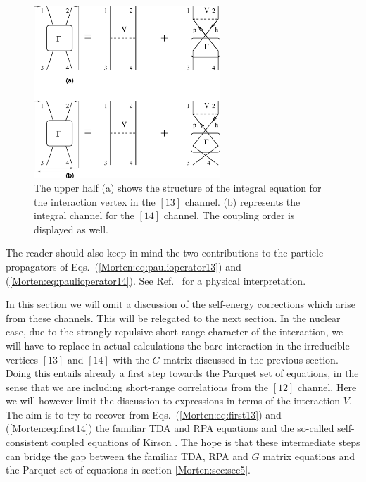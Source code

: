 \begin{figure}%
	\begin{center} \includegraphics[width=7cm]{ch1314.eps}
      	\end{center} 

\caption{The upper half (a) shows the structure of
the integral equation for the interaction vertex in the $[13]$
channel. (b) represents the integral channel for the $[14]$
channel.  The coupling order is displayed as well.}
\label{Morten:fig:figs1314}
\end{figure}
The reader should also keep in mind the two contributions to the
particle propagators of Eqs.~(\ref{Morten:eq:paulioperator13}) and
(\ref{Morten:eq:paulioperator14}).  See Ref.~ for
a physical interpretation.

In this section we will omit a discussion of the self-energy corrections
which arise from these channels. This
will be relegated to the next section. In the nuclear
case, due to the strongly repulsive short-range character 
of the interaction, we will have 
to replace in actual calculations 
the bare interaction in the irreducible vertices $[13]$ and $[14]$
with the $G$ matrix discussed in the previous section. 
Doing this entails already a first step towards the Parquet set of equations,
in the sense that we are including short-range correlations from the 
$[12]$ channel. 
Here we will however limit the discussion to expressions 
in terms of the interaction $V$.
The aim is to try 
to recover from Eqs.~(\ref{Morten:eq:first13}) 
and (\ref{Morten:eq:first14}) the familiar TDA and RPA equations and the 
so-called self-consistent coupled equations of Kirson \cite{Morten:kirson74}.
The hope is that these intermediate steps can bridge the 
gap between the familiar
TDA, RPA and $G$ matrix equations and the Parquet set of equations
in section \ref{Morten:sec:sec5}. 



